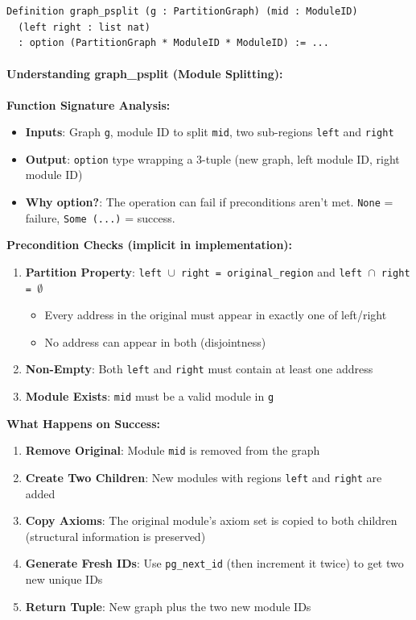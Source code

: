 \begin{lstlisting}
Definition graph_psplit (g : PartitionGraph) (mid : ModuleID)
  (left right : list nat)
  : option (PartitionGraph * ModuleID * ModuleID) := ...
\end{lstlisting}

\paragraph{Understanding graph\_psplit (Module Splitting):}
\textbf{Function Signature Analysis:}
\begin{itemize}
    \item \textbf{Inputs}: Graph \texttt{g}, module ID to split \texttt{mid}, two sub-regions \texttt{left} and \texttt{right}
    \item \textbf{Output}: \texttt{option} type wrapping a 3-tuple (new graph, left module ID, right module ID)
    \item \textbf{Why option?}: The operation can fail if preconditions aren't met. \texttt{None} = failure, \texttt{Some (...)} = success.
\end{itemize}

\textbf{Precondition Checks (implicit in implementation):}
\begin{enumerate}
    \item \textbf{Partition Property}: \texttt{left $\cup$ right = original\_region} and \texttt{left $\cap$ right = $\emptyset$}
    \begin{itemize}
        \item Every address in the original must appear in exactly one of left/right
        \item No address can appear in both (disjointness)
    \end{itemize}
    \item \textbf{Non-Empty}: Both \texttt{left} and \texttt{right} must contain at least one address
    \item \textbf{Module Exists}: \texttt{mid} must be a valid module in \texttt{g}
\end{enumerate}

\textbf{What Happens on Success:}
\begin{enumerate}
    \item \textbf{Remove Original}: Module \texttt{mid} is removed from the graph
    \item \textbf{Create Two Children}: New modules with regions \texttt{left} and \texttt{right} are added
    \item \textbf{Copy Axioms}: The original module's axiom set is copied to both children (structural information is preserved)
    \item \textbf{Generate Fresh IDs}: Use \texttt{pg\_next\_id} (then increment it twice) to get two new unique IDs
    \item \textbf{Return Tuple}: New graph plus the two new module IDs
\end{enumerate}

